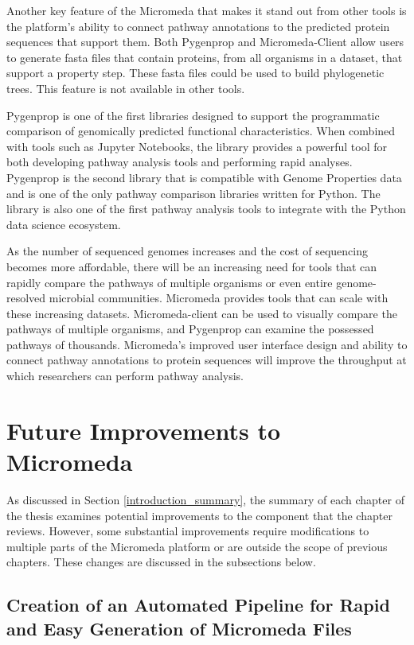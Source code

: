 Another key feature of the Micromeda that makes it stand out from other 
tools is the platform's ability to connect pathway annotations to the predicted protein 
sequences that support them. Both Pygenprop and Micromeda-Client allow users to 
generate \gls{fasta} files that contain proteins, from all organisms in a dataset, 
that support a property step. These \gls{fasta} files could be used to build 
phylogenetic trees. This feature is not available in other tools.

Pygenprop is one of the first libraries designed to support the programmatic 
comparison of genomically predicted functional characteristics. When combined 
with tools such as Jupyter Notebooks, the library provides a powerful tool for 
both developing pathway analysis tools and performing rapid analyses. Pygenprop 
is the second library that is compatible with Genome Properties data and is one 
of the only pathway comparison libraries written for Python. The library is also one 
of the first pathway analysis tools to integrate with the Python data science 
ecosystem.

As the number of sequenced genomes increases and the cost of sequencing becomes 
more affordable, there will be an increasing need for tools that can rapidly 
compare the pathways of multiple organisms or even entire genome-resolved 
microbial communities. Micromeda provides tools that can scale with these 
increasing datasets. Micromeda-client can be used to visually compare the 
pathways of multiple organisms, and Pygenprop can examine the possessed pathways 
of thousands. Micromeda's improved user interface design and ability to connect 
pathway annotations to protein sequences will improve the throughput at which
researchers can perform pathway analysis.

\section{Future Improvements to Micromeda}

As discussed in Section \ref{introduction_summary}, the summary of each chapter 
of the thesis examines potential improvements to the component that the chapter 
reviews. However, some substantial improvements require modifications to 
multiple parts of the Micromeda platform or are outside the scope of previous 
chapters. These changes are discussed in the subsections below.

\subsection{Creation of an Automated Pipeline for Rapid and Easy Generation of 
Micromeda Files} \label{pipeline-development}

